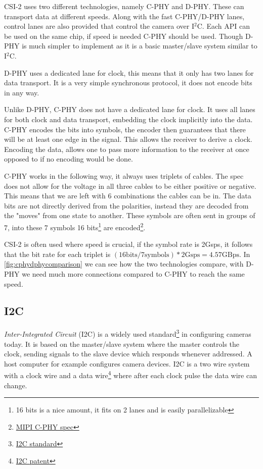 CSI-2 uses two different technologies, namely C-PHY and D-PHY. These can
transport data at different speeds. Along with the fast C-PHY/D-PHY lanes,
control lanes are also provided that control the camera over I$^2$C. Each API
can be used on the same chip, if speed is needed C-PHY should be used. Though
D-PHY is much simpler to implement as it is a basic master/slave system similar
to I$^2$C.

D-PHY uses a dedicated lane for clock, this means that it only has two lanes for
data transport. It is a very simple synchronous protocol, it does not encode
bits in any way.

Unlike D-PHY, C-PHY does not have a dedicated lane for clock. It uses all lanes
for both clock and data transport, embedding the clock implicitly into the
data. C-PHY encodes the bits into symbols, the encoder then guarantees that
there will be at least one edge in the signal. This allows the receiver to
derive a clock. Encoding the data, allows one to pass more information to the
receiver at once opposed to if no encoding would be done.

C-PHY works in the following way, it always uses triplets of cables. The spec
does not allow for the voltage in all three cables to be either positive or
negative. This means that we are left with 6 combinations the cables can be in.
The data bits are not directly derived from the polarities, instead they are
decoded from the "moves" from one state to another. These symbols are often
sent in groups of 7, into these 7 symbols 16 bits\footnote{16 bits is a nice
amount, it fits on 2 lanes and is easily parallelizable} are encoded\footnote{\href{https://www.mipi.org/specifications/c-phy}{MIPI C-PHY spec}}.

CSI-2 is often used where speed is crucial, if the symbol rate is 2Gsps,
it follows that the bit rate for each triplet is
$(16\text{bits} / 7\text{symbols}) * 2\text{Gsps} = 4.57 \text{GBps}$.
In \cref{fig:cphydphycomparison} we can see how the two technologies compare,
with D-PHY we need much more connections compared to C-PHY to reach the same
speed.

\subsection{I2C}
\textit{Inter-Integrated Circuit} (I2C) is a widely used standard\footnote{\href{https://web.archive.org/web/20221006073143/http://www.nxp.com/docs/en/user-guide/UM10204.pdf}{I2C standard}}
in configuring cameras today. It is based on the
master/slave system where the master controls the clock, sending signals to the
slave device which responds whenever addressed. A host computer for example
configures camera devices. I2C is a two wire system with a clock wire and a
data wire\footnote{\href{https://patents.google.com/patent/US4689740A/en}{I2C patent}}
where after each clock pulse the data wire can change.

